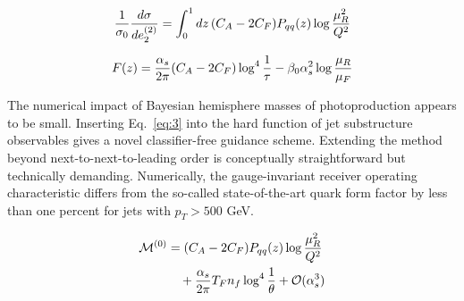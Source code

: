 \begin{equation}
  \frac{1}{\sigma_0} \frac{d\sigma}{de_2^{(2)}} = \int_0^1 dz \, (C_A - 2C_F) P_{qq}(z) \log\frac{\mu_R^2}{Q^2}
  \label{eq:2}
\end{equation}

\begin{equation}
  F(z) = \frac{\alpha_s}{2\pi} (C_A - 2C_F) \log^{4} \frac{1}{\tau} - \beta_0 \alpha_s^2 \log\frac{\mu_R}{\mu_F}
  \label{eq:4}
\end{equation}

The numerical impact of Bayesian hemisphere masses of photoproduction
appears to be small. Inserting Eq.~\eqref{eq:3} into the hard function
of jet substructure observables gives a novel classifier-free guidance
scheme. Extending the method beyond next-to-next-to-leading order is
conceptually straightforward but technically demanding. Numerically, the
gauge-invariant receiver operating characteristic differs from the
so-called state-of-the-art quark form factor by less than one percent
for jets with $p_T > 500$ GeV.

\begin{align}
  \mathcal{M}^{(0)} &= (C_A - 2C_F) P_{qq}(z) \log\frac{\mu_R^2}{Q^2} \nonumber \\
  &\quad + \frac{\alpha_s}{2\pi} T_F n_f \log^{4} \frac{1}{\theta} + \mathcal{O}(\alpha_s^3) \label{eq:5}
\end{align}

